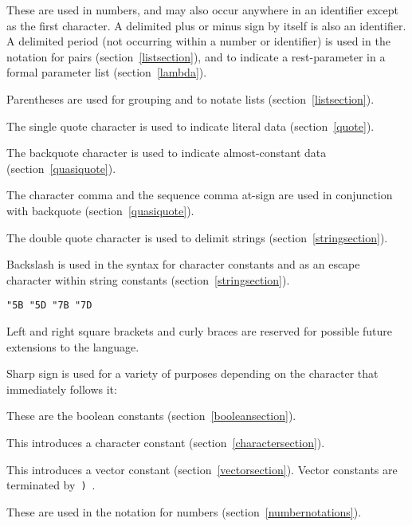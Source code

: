 \begin{description}{}{}

\item[{\tt.\ + -}]
These are used in numbers, and may also occur anywhere in an identifier
except as the first character.  A delimited plus or minus sign by itself
is also an identifier.
A delimited period (not occurring within a number or identifier) is used
in the notation for pairs (section~\ref{listsection}), and to indicate a
rest-parameter in a  formal parameter list (section~\ref{lambda}).

\item[\tt( )]
Parentheses are used for grouping and to notate lists
(section~\ref{listsection}).

\item[\singlequote]
The single quote character is used to indicate literal data (section~\ref{quote}).

\item[\backquote]
The backquote character is used to indicate almost-constant
data (section~\ref{quasiquote}).

\item[\tt, ,@]
The character comma and the sequence comma at-sign are used in conjunction
with backquote (section~\ref{quasiquote}).

\item[\tt"]
The double quote character is used to delimit strings (section~\ref{stringsection}).

\item[\backwhack]
Backslash is used in the syntax for character constants and as an escape
character within string constants (section~\ref{stringsection}).

\hbox{\tt \char"5B{} \char"5D{} \char"7B{} \char"7D}
\item[\copy0]
Left and right square brackets and curly braces
are reserved for possible future extensions to the language.

\item[\sharpsign] Sharp sign is used for a variety of purposes depending on
the character that immediately follows it:

\item[\schtrue{} \schfalse{}]
These are the boolean constants (section~\ref{booleansection}).

\item[\sharpsign\backwhack]
This introduces a character constant (section~\ref{charactersection}).

\item[\sharpsign\tt(]
This introduces a vector constant (section~\ref{vectorsection}).  Vector constants
are terminated by~{\tt)}~.

\item[{\tt\#e \#i \#l \#s \#b \#o \#d \#x}]
These are used in the notation for numbers (section~\ref{numbernotations}).

\end{description}
